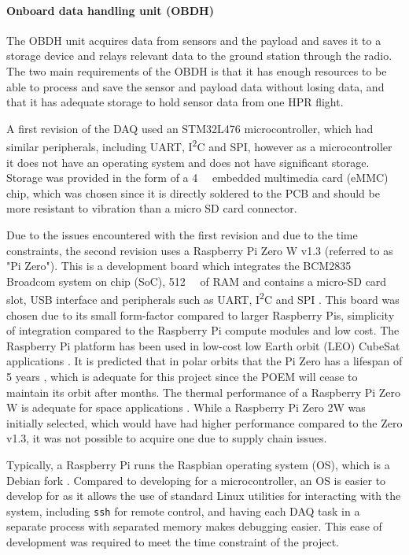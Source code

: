 \documentclass[a4paper,11pt]{article}
\newcommand{\iic}{{I\textsuperscript{2}C}}
\begin{document}
\paragraph{Onboard data handling unit (OBDH)}

The OBDH unit acquires data from sensors and the payload and saves it to a storage device and relays relevant data to the ground station through the radio. The two main requirements of the OBDH is that it has enough resources to be able to process and save the sensor and payload data without losing data, and that it has adequate storage to hold sensor data from one HPR flight.

A first revision of the DAQ used an STM32L476 microcontroller, which had similar peripherals, including UART, {\iic} and SPI, however as a microcontroller it does not have an operating system and does not have significant storage. Storage was provided in the form of a \SI{4}{\giga\byte} embedded multimedia card (eMMC) chip, which was chosen since it is directly soldered to the PCB and should be more resistant to vibration than a micro SD card connector.

Due to the issues encountered with the first revision and due to the time constraints, the second revision uses a Raspberry Pi Zero W v1.3 (referred to as "Pi Zero"). This is a development board which integrates the BCM2835 Broadcom system on chip (SoC), \SI{512}{\mega\byte} of RAM and contains a micro-SD card slot, USB interface and peripherals such as UART, {\iic} and SPI \cite{upton2016raspberry}. This board was chosen due to its small form-factor compared to larger Raspberry Pis, simplicity of integration compared to the Raspberry Pi compute modules and low cost. The Raspberry Pi platform has been used in low-cost low Earth orbit (LEO) CubeSat applications \cite{guertin2022raspberry}. It is predicted that in polar orbits that the Pi Zero has a lifespan of 5 years \cite{guertin2022raspberry}, which is adequate for this project since the POEM will cease to maintain its orbit after  months. The thermal performance of a Raspberry Pi Zero W is adequate for space applications \cite{guertin2022raspberry}. While a Raspberry Pi Zero 2W was initially selected, which would have had higher performance compared to the Zero v1.3, it was not possible to acquire one due to supply chain issues.

Typically, a Raspberry Pi runs the Raspbian operating system (OS), which is a Debian fork \cite{upton2016raspberry}. Compared to developing for a microcontroller, an OS is easier to develop for as it allows the use of standard Linux utilities for interacting with the system, including \texttt{ssh} for remote control, and having each DAQ task in a separate process with separated memory makes debugging easier. This ease of development was required to meet the time constraint of the project. %
\end{document}
